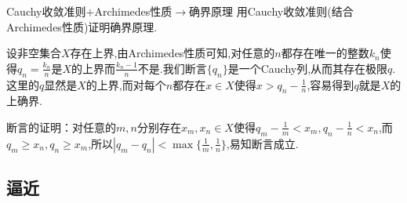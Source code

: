 \begin{exercise}{Cauchy收敛准则$+$Archimedes性质$\to$确界原理}
	用Cauchy收敛准则(结合Archimedes性质)证明确界原理. 
\end{exercise}
\begin{solution}
	设非空集合$X$存在上界,由Archimedes性质可知,对任意的$n$都存在唯一的整数$k_n$使得$q_n=\frac{k_n}{n}$是$X$的上界而$\frac{k_n-1}{n}$不是.我们断言$\{ q_n \}$是一个Cauchy列,从而其存在极限$q$.这里的$q$显然是$X$的上界,而对每个$n$都存在$x \in X$使得$x>q_n-\frac{1}{n}$,容易得到$q$就是$X$的上确界.
	
	断言的证明：对任意的$m,n$分别存在$x_m,x_n \in X$使得$q_m-\frac{1}{m} < x_m,q_n-\frac{1}{n} < x_n$,而$q_m \geq x_n,q_n \geq x_m$,所以$|q_m-q_n|<\max \{ \frac{1}{m},\frac{1}{n} \}$,易知断言成立.
\end{solution}

\clearpage
\subsection{逼近}

